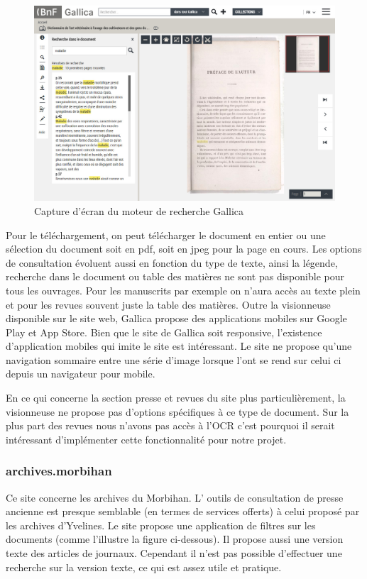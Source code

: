         \begin{figure}[ht!]
            \centering
            \includegraphics[width=1\textwidth]{figure/screenshot_gallica.jpg}
            \caption{Capture d'écran du moteur de recherche Gallica}
            \label{fig:gallica}
        \end{figure}

        Pour le téléchargement, on peut télécharger le document en entier ou une sélection du document soit en pdf,
        soit en jpeg pour la page en cours. Les options de consultation évoluent aussi en fonction du type de texte,
        ainsi la légende, recherche dans le document ou table des matières ne sont pas disponible pour tous les ouvrages.
        Pour les manuscrits par exemple on n’aura accès au texte plein et pour les revues souvent juste la table des matières.
        Outre la visionneuse disponible sur le site web, Gallica propose des applications mobiles sur Google Play et App Store.
        Bien que le site de Gallica soit responsive, l'existence d’application mobiles qui imite le site est intéressant.
        Le site ne propose qu’une navigation sommaire entre une série d’image lorsque l’ont se rend sur celui ci depuis un navigateur pour mobile.

        En ce qui concerne la section presse et revues du site plus particulièrement, la visionneuse ne propose
        pas d’options spécifiques à ce type de document. Sur la plus part des revues nous n’avons pas accès à l’OCR
        c’est pourquoi il serait intéressant d’implémenter cette fonctionnalité pour notre projet.

        \subsubsection{archives.morbihan}
        \label{subsubsec:morbihan}
        Ce site concerne les archives du Morbihan. L’ outils de consultation de presse ancienne est presque semblable
        (en termes de services offerts) à celui proposé par les archives d’Yvelines. Le site propose une application
        de filtres sur les documents (comme l’illustre la figure ci-dessous). Il propose aussi une version texte des
        articles de journaux. Cependant il n’est pas possible d’effectuer une recherche sur la version texte,
        ce qui est assez utile et pratique.

